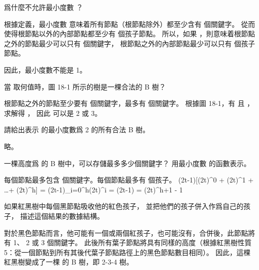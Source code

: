 \startsection[
  title={Definition of B-trees},
]
\startEXERCISE
爲什麼不允許最小度數 ？
\stopEXERCISE

\startANSWER
根據定義，最小度數  意味着所有節點（根節點除外）都至少含有  個關鍵字。
從而使得根節點以外的內部節點都至少有  個孩子節點。
所以，如果 ，則意味着根節點之外的節點最少可以只有  個關鍵字，
根節點之外的內部節點最少可以只有  個孩子節點。

因此，最小度數不能是 1。
\stopANSWER

\startEXERCISE
當  取何值時，圖 18-1 所示的樹是一棵合法的 B 樹？
\stopEXERCISE

\startANSWER
根節點之外的節點至少要有  個關鍵字，最多有  個關鍵字。
根據圖 18-1，有  且 ，求解得 ，
因此  可以是 2 或 3。
\stopANSWER

\startEXERCISE
請給出表示  的最小度數爲 2 的所有合法 B 樹。
\stopEXERCISE

\startANSWER
略。
\stopANSWER

\startEXERCISE
一棵高度爲  的 B 樹中，可以存儲最多多少個關鍵字？
用最小度數  的函數表示。
\stopEXERCISE

\startANSWER
每個節點最多包含  個關鍵字。每個節點最多有  個孩子。
\startformula\startmathalignment
\NC \NC (2t-1)[(2t)^0 + (2t)^1 + \ldots + (2t)^h] \NR
\NC = \NC (2t-1)\sum_{i=0}^{h}(2t)^i \NR
\NC = \NC (2t-1) \NR
\NC = \NC (2t)^{h+1} - 1 \NR
\stopmathalignment\stopformula
\stopANSWER

\startEXERCISE
如果紅黑樹中每個黑節點吸收他的紅色孩子，
並把他們的孩子併入作爲自己的孩子，
描述這個結果的數據結構。
\stopEXERCISE

\startANSWER
對於黑色節點而言，他可能有一個或兩個紅孩子，也可能沒有，合併後，此節點將有 1、 2 或 3 個關鍵字。
此後所有葉子節點將具有同樣的高度（根據紅黑樹性質 5：從一個節點到所有其後代葉子節點路徑上的黑色節點數目相同）。
因此，這棵紅黑樹變成了一棵  的 B 樹，即 2-3-4 樹。
\stopANSWER

\stopsection
